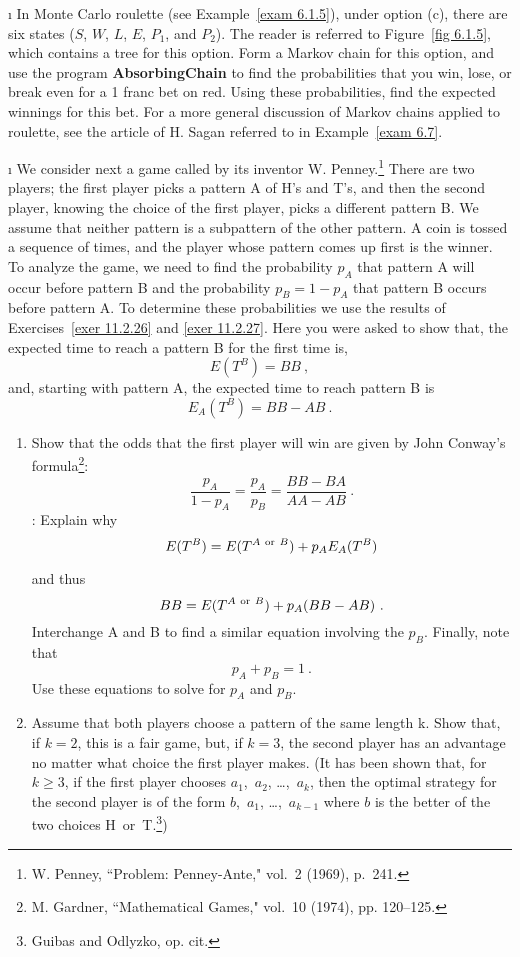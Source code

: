 \begin{LJSItem}
\i\label{exer 11.2.34}  In Monte Carlo roulette (see
Example~\ref{exam 6.1.5}),
under option (c), there are six states ($S$, $W$, $L$, $E$, $P_1$, and $P_2$). 
The reader
is referred to Figure~\ref{fig 6.1.5}, which contains a tree for this option. 
Form 
a Markov chain for this option, and use the program {\bf AbsorbingChain} to
find the
probabilities that you win, lose, or break even for a 1 franc bet on red. 
Using these
probabilities, find the expected winnings for this bet.  For a more general
discussion of 
Markov chains applied to roulette, see the article of H. Sagan referred to in 
Example~\ref{exam 6.7}.

\i\label{exer 11.5.26} We consider next a game called  by its 
inventor W. Penney.\footnote{W. Penney, ``Problem: Penney-Ante,"  vol.~2 (1969), p.~241.}  There are two
players; the first
player picks a pattern  A of H's and T's, and then the second player,
knowing the choice of the first player, picks a different pattern B.
We assume that neither pattern is a subpattern of the other pattern.
A coin is tossed a sequence of times, and the player
whose pattern comes up first is the winner.  To analyze the game, we need to
find the
probability $p_A$ that pattern A will occur before 
pattern B and the probability $p_B = 1- p_A$ that pattern
B occurs before pattern A. To determine these probabilities we use the
results of 
Exercises~\ref{exer 11.2.26} and \ref{exer 11.2.27}.  Here you were asked
to  show that, the expected time to
reach a pattern B for the first time is,
$$
E(T^B) = BB\ ,
$$
and, starting with pattern A, the expected time to reach pattern B is
$$
E_A(T^B) = BB - AB\ .
$$

\begin{enumerate}
\item Show that the odds that the first player will win are given by John
Conway's
formula\footnote{M. Gardner, ``Mathematical Games," 
 vol.~10 (1974), pp. 120--125.}:
$$
\frac{p_A}{1-p_A} = \frac{p_A}{p_B} = \frac{BB - BA}{AA - AB}\ .
$$
: Explain why 
$$
E(T^B) = E(T^{A\ {\rm or}\ B}) + p_A E_A(T^B)
$$

and thus
$$
BB = E(T^{A\ {\rm or}\ B}) + p_A (BB - AB)\ .
$$
Interchange A and B to find a similar equation involving 
the  $p_B$.  Finally, note that
$$
p_A + p_B = 1\ .$$
Use these equations to solve for $p_A$ and $p_B$.

\item Assume that both players choose a pattern of the same length k. Show
that, if $k = 2$, this is a fair game, but, if $k =
3$, the second player has an advantage no matter what choice the first player
makes. 
(It has been shown that, for $k \geq 3$, if the first player chooses
$a_1$,~$a_2$, \ldots,~$a_k$, then the optimal strategy for the second player is
of the form $b$,~$a_1$, \ldots,~$a_{k - 1}$ where $b$ is the better of the two
choices H~or~T.\footnote{Guibas and Odlyzko, op. cit.})
\end{enumerate}

\end{LJSItem}

